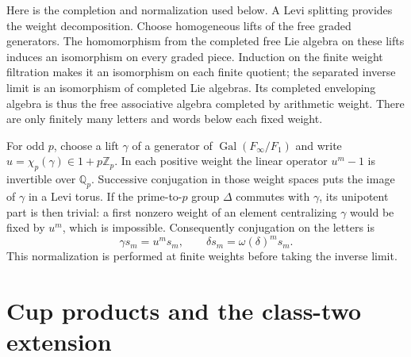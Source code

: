 \documentclass[11pt]{article}
\theoremstyle{definition}
\numberwithin{equation}{section}
\begin{document}
Here is the completion and normalization used below. A Levi splitting
provides the weight decomposition. Choose homogeneous lifts of the
free graded generators. The homomorphism from the completed free Lie
algebra on these lifts induces an isomorphism on every graded piece.
Induction on the finite weight filtration makes it an isomorphism
on each finite quotient; the separated inverse limit is an isomorphism
of completed Lie algebras. Its completed enveloping algebra is thus
the free associative algebra completed by arithmetic weight.
There are only finitely many letters and words below each fixed weight.

For odd $p$, choose a lift $\gamma$ of a generator of
$\operatorname{Gal}(F_\infty/F_1)$ and write
$u=\chi_p(\gamma)\in1+p\mathbb Z_p$. In each positive weight the
linear operator $u^m-1$ is invertible over $\mathbb Q_p$. Successive
conjugation in those weight spaces puts the image of $\gamma$ in
a Levi torus. If the prime-to-$p$ group $\Delta$ commutes with
$\gamma$, its unipotent part is then trivial: a first nonzero weight
of an element centralizing $\gamma$ would be fixed by $u^m$, which
is impossible. Consequently conjugation on the letters is
\begin{equation}
 \gamma s_m=u^m s_m,\qquad
 \delta s_m=\omega(\delta)^m s_m.
\end{equation}
This normalization is performed at finite
weights before taking the inverse limit.

\section{Cup products and the class-two extension}
\end{document}
